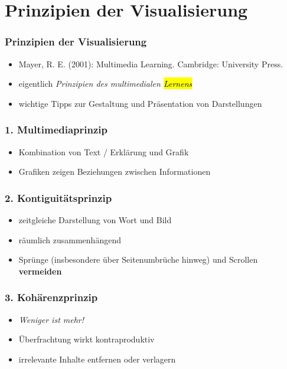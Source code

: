 \section{Prinzipien der Visualisierung}


\begin{frame}
\frametitle{Prinzipien der Visualisierung}

\begin{itemize}
	\item Mayer, R. E. (2001): Multimedia Learning. Cambridge: University Press.
	\item eigentlich \textit{Prinzipien des multimedialen \hl{Lernens}}
	\item wichtige Tipps zur Gestaltung und Präsentation von Darstellungen
\end{itemize}
\end{frame}


\begin{frame}
\frametitle{1. Multimediaprinzip}

\begin{itemize}
	\item Kombination von Text / Erklärung und Grafik
	\item Grafiken zeigen Beziehungen zwischen Informationen
\end{itemize}
\end{frame}


\begin{frame}
\frametitle{2. Kontiguitätsprinzip}

\begin{itemize}
	\item zeitgleiche Darstellung von Wort und Bild
	\item räumlich zusammenhängend
	\item Sprünge (insbesondere über Seitenumbrüche hinweg) und Scrollen \textbf{vermeiden}
\end{itemize}
\end{frame}


\begin{frame}
\frametitle{3. Kohärenzprinzip}

\begin{itemize}
	\item \textit{Weniger ist mehr!}
	\item Überfrachtung wirkt kontraproduktiv
	\item irrelevante Inhalte entfernen oder verlagern
\end{itemize}
\end{frame}


